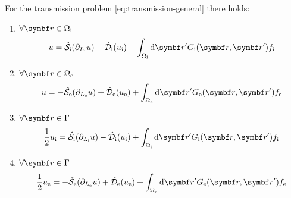 \begin{lemma}
For the transmission problem \ref{eq:transmission-general} there holds:
\begin{enumerate}
\item $\forall \vect{r} \in \Omegai$
\begin{equation}
u = \bi{S}_\mathrm{i}(\partiali u)
- \bi{D}_\mathrm{i}(\ui) + \int_{\Omegai}\diff \vect{r}^\prime \Gi f_\mathrm{i}
\end{equation}
\item $\forall \vect{r} \in \Omegae$
\begin{equation}
u = -\bi{S}_\mathrm{e}(\partiale u)
+ \bi{D}_\mathrm{e}(\ue) + \int_{\Omegae}\diff \vect{r}^\prime\Ge f_\mathrm{e}
\end{equation}
\item $\forall \vect{r} \in \Gamma$
  \begin{equation}\label{eq:stat3}
    \frac{1}{2}\ui = \bi{S}_\mathrm{i}(\partiali u)
    - \bi{D}_\mathrm{i}(\ui) + \int_{\Omegai}\diff \vect{r}^\prime\Gi f_\mathrm{i}
  \end{equation}
\item $\forall \vect{r} \in \Gamma$
  \begin{equation}\label{eq:stat4}
    \frac{1}{2}\ue = -\bi{S}_\mathrm{e}(\partiale u)
    + \bi{D}_\mathrm{e}(\ue) + \int_{\Omegae}\diff \vect{r}^\prime\Ge f_\mathrm{e}
  \end{equation}
\end{enumerate}
\end{lemma}

